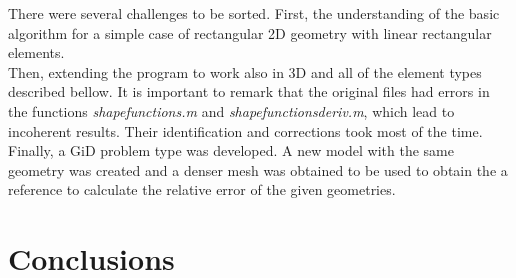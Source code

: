 \documentclass[paper=a4, fontsize=11pt]{article} %
\numberwithin{equation}{section} %
\numberwithin{figure}{section} %
\numberwithin{table}{section} %
\begin{document}
There were several challenges to be sorted. First, the understanding of the basic algorithm for a simple case of rectangular 2D geometry with linear rectangular elements.\\

Then, extending the program to work also in 3D and all of the element types described bellow.
It is important to remark that the original files had errors in the functions \textit{shapefunctions.m} and \textit{shapefunctionsderiv.m}, which lead to incoherent results. Their identification and corrections took most of the time.\\

Finally, a GiD problem type was developed. A new model with the same geometry was created and a denser mesh was obtained to be used to obtain the a reference to calculate the relative error of the given geometries.

\section{\textbf{Conclusions}}
\end{document}
